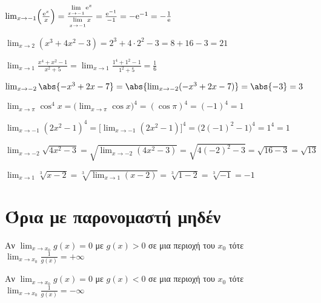 \begin{example}
  $ \lim_{x \to -1} \Bigl(\frac{\mathrm{e}^{x}}{x}\Bigr) = \frac{\lim\limits_{x \to -1}
  \mathrm{e}^{x}}{\lim\limits_{x \to -1}x} = \frac{\mathrm{e}^{-1}}{-1} = -
  \mathrm{e}^{-1} = - \frac{1}{\mathrm{e}} $  
\end{example}

\begin{example}
  $ \lim_{x \to 2} (x^{3}+4x^{2}-3) = 2^{3}+ 4 \cdot 2^{2} -3 = 8+16-3 = 21 $  
\end{example}

\begin{example}
  $ \lim_{x \to 1} \frac{x^{4}+x^{2}-1}{x^{2}+5} = \lim_{x \to 1}
  \frac{1^{4}+1^{2}-1}{1^{2}+5} = \frac{1}{6} $
\end{example}

\begin{example}
  $ \lim_{x \to -2} \abs{-x^{3}+2x-7} = \abs{\lim_{x \to -2} (-x^{3}+2x-7)} = \abs{-3}
  = 3$ 
\end{example}

\begin{example}
  $ \lim_{x \to \pi} \cos^{4}{x} = \bigl(\lim_{x \to \pi} \cos{x} \bigr)^{4} =
  (\cos{\pi} )^{4} = (-1)^{4}=1 $
\end{example}

\begin{example} 
  $\lim_{x \to -1} (2x^{2}-1)^{4} = \bigl[\lim_{x \to -1}
  (2x^{2}-1)\bigr]^{4} = \bigl(2(-1)^{2}-1\bigr)^{4} = 1^{4} = 1 $ 
\end{example}

\begin{example}
  $ \lim_{x \to -2} \sqrt{4x^{2}-3} = \sqrt{\lim_{x \to -2} (4x^{2}-3)} =
  \sqrt{4(-2)^{2}-3} = \sqrt{16-3} = \sqrt{13} $    
\end{example}

\begin{example}
  $ \lim_{x \to 1} \sqrt[3]{x-2} = \sqrt[3]{\lim_{x \to 1} (x-2)} = \sqrt[3]{1-2} =
  \sqrt[3]{-1} = -1 $
\end{example}


\section*{Όρια με παρονομαστή μηδέν}

\begin{prop}
\item {}
  \begin{myitemize}
    \item Αν $ \lim_{x \to x_{0}} g(x) = 0 $ με $ g(x)>0 $ σε μια περιοχή του $ x_{0} $ 
      τότε $ \lim_{x \to x_{0}} \frac{1}{g(x)} = + \infty $
    \item Αν $ \lim_{x \to x_{0}} g(x) = 0 $ με $ g(x)<0 $ σε μια περιοχή του $ x_{0} $ 
      τότε $ \lim_{x \to x_{0}} \frac{1}{g(x)} = - \infty $
  \end{myitemize}
\end{prop}


